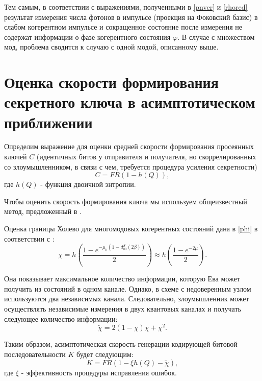 Тем самым, в соответствии с выражениями, полученными в \ref{pnver} и \ref{rhored} результат измерения числа фотонов в импульсе (проекция на Фоковский базис) в слабом когерентном импульсе и сокращенное состояние после измерения не содержат информации о фазе когерентного состояния $\varphi$. В случае с множеством мод, проблема сводится к случаю с одной модой, описанному выше.
\pagebreak

\section{Оценка скорости формирования секретного ключа в асимптотическом приближении} \label{ch:ch6/sec2}

Определим выражение для оценки средней скорости формирования просеянных ключей $C$ (идентичных битов у отправителя и получателя, но скоррелированных со злоумышленником, в связи с чем, требуется процедура усиления секретности) 
\begin{equation}
    C=FR(1-h(Q)),
\end{equation}
где $h(Q)$ - функция двоичной энтропии.

Чтобы оценить скорость формирования ключа мы используем общеизвестный метод, предложенный в \cite{devetak2005distillation}.

Оценка границы Холево для многомодовых когерентных состояний дана в \ref{phi} в соответствии с \cite{kozubov2019finite}:
\begin{equation}
    \chi=h\left(\frac{1-e^{-\mu_0(1-d^S_{00}(2\beta))}}{2}\right)\approx h\left(\frac{1-e^{-2\mu}}{2}\right).
\end{equation}

Она показывает максимальное количество информации, которую Ева может получить из состояний в одном канале. Однако, в схеме с недоверенным узлом используются два независимых канала. Следовательно, злоумышленник может осуществлять независимые измерения в двух квантовых каналах и получать следующее количество информации:
\begin{equation}
    \tilde{\chi}=2(1-\chi)\chi+\chi^2.
\end{equation}

Таким образом, асимптотическая скорость генерации кодирующей битовой последовательности $K$ будет следующим:
\begin{equation}
     K=FR(1-\xi h(Q)-\tilde{\chi}),
\end{equation}
где $\xi$ - эффективность процедуры исправления ошибок. 

